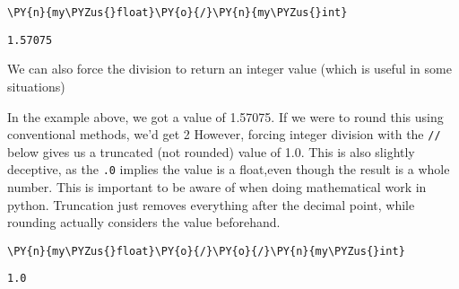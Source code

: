     \begin{tcolorbox}[breakable, size=fbox, boxrule=1pt, pad at break*=1mm,colback=cellbackground, colframe=cellborder]
\begin{Verbatim}[commandchars=\\\{\}]
\PY{n}{my\PYZus{}float}\PY{o}{/}\PY{n}{my\PYZus{}int}
\end{Verbatim}
\end{tcolorbox}

            \begin{tcolorbox}[breakable, size=fbox, boxrule=.5pt, pad at break*=1mm, opacityfill=0]
\begin{Verbatim}[commandchars=\\\{\}]
1.57075
\end{Verbatim}
\end{tcolorbox}
        
    We can also force the division to return an integer value (which is
useful in some situations)

In the example above, we got a value of 1.57075. If we were to round
this using conventional methods, we'd get 2 However, forcing integer
division with the \texttt{//} below gives us a truncated (not rounded)
value of 1.0. This is also slightly deceptive, as the \texttt{.0}
implies the value is a float,even though the result is a whole number.
This is important to be aware of when doing mathematical work in python.
Truncation just removes everything after the decimal point, while
rounding actually considers the value beforehand.

    \begin{tcolorbox}[breakable, size=fbox, boxrule=1pt, pad at break*=1mm,colback=cellbackground, colframe=cellborder]
\begin{Verbatim}[commandchars=\\\{\}]
\PY{n}{my\PYZus{}float}\PY{o}{/}\PY{o}{/}\PY{n}{my\PYZus{}int}
\end{Verbatim}
\end{tcolorbox}

            \begin{tcolorbox}[breakable, size=fbox, boxrule=.5pt, pad at break*=1mm, opacityfill=0]
\begin{Verbatim}[commandchars=\\\{\}]
1.0
\end{Verbatim}
\end{tcolorbox}
        
